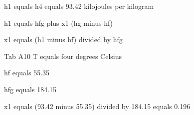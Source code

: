 h1 equals h4 equals 93.42 kilojoules per kilogram

h1 equals hfg plus x1 (hg minus hf)

x1 equals (h1 minus hf) divided by hfg

Tab A10 T equals four degrees Celsius

hf equals 55.35

hfg equals 184.15

x1 equals (93.42 minus 55.35) divided by 184.15 equals 0.196